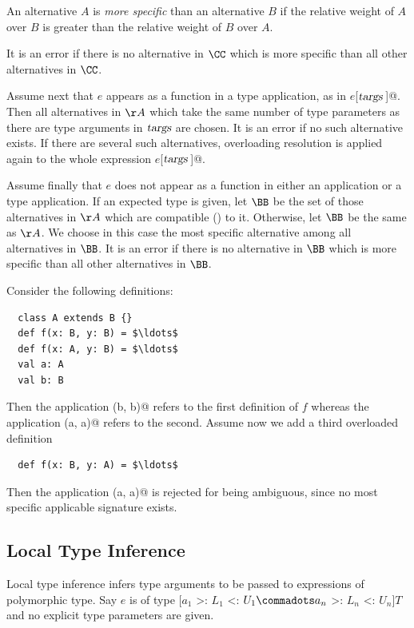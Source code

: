 An alternative $A$ is {\em more specific} than an alternative $B$ if
the relative weight of $A$ over $B$ is greater than the relative
weight of $B$ over $A$.

It is an error if there is no alternative in $\CC$ which is more
specific than all other alternatives in $\CC$.

Assume next that $e$ appears as a function in a type application, as
in \lstinline@$e$[$\mbox{\sl targs}\,$]@. Then all alternatives in
$\AA$ which take the same number of type parameters as there are type
arguments in $\mbox{\sl targs}$ are chosen. It is an error if no such alternative exists.
If there are several such alternatives, overloading resolution is
applied again to the whole expression \lstinline@$e$[$\mbox{\sl targs}\,$]@.  

Assume finally that $e$ does not appear as a function in either
an application or a type application. If an expected type is given,
let $\BB$ be the set of those alternatives in $\AA$ which are
compatible () to it. Otherwise, let $\BB$ be the same as $\AA$.
We choose in this case the most specific alternative among all
alternatives in $\BB$. It is an error if there is no 
alternative in $\BB$ which is more specific than all other
alternatives in $\BB$.

\example Consider the following definitions:

\begin{lstlisting}
  class A extends B {}
  def f(x: B, y: B) = $\ldots$
  def f(x: A, y: B) = $\ldots$
  val a: A 
  val b: B
\end{lstlisting}
Then the application \lstinline@f(b, b)@ refers to the first
definition of $f$ whereas the application \lstinline@f(a, a)@
refers to the second.  Assume now we add a third overloaded definition
\begin{lstlisting}
  def f(x: B, y: A) = $\ldots$
\end{lstlisting}
Then the application \lstinline@f(a, a)@ is rejected for being ambiguous, since
no most specific applicable signature exists.

\subsection{Local Type Inference}
\label{sec:local-type-inf}

Local type inference infers type arguments to be passed to expressions
of polymorphic type. Say $e$ is of type [$a_1$ >: $L_1$ <: $U_1
\commadots a_n$ >: $L_n$ <: $U_n$]$T$ and no explicit type parameters
are given. 

